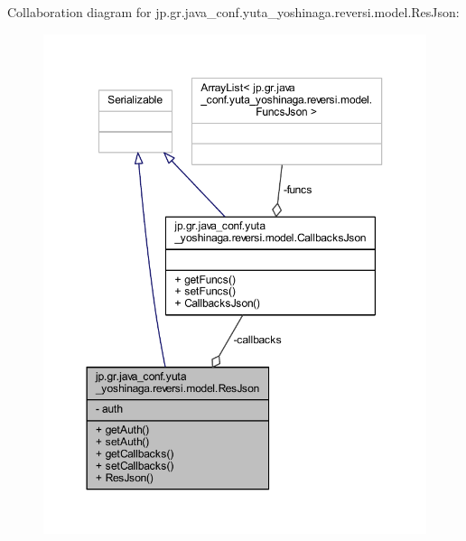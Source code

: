 Collaboration diagram for jp.\+gr.\+java\+\_\+conf.\+yuta\+\_\+yoshinaga.\+reversi.\+model.\+Res\+Json\+:\nopagebreak
\begin{figure}[H]
\begin{center}
\leavevmode
\includegraphics[width=350pt]{classjp_1_1gr_1_1java__conf_1_1yuta__yoshinaga_1_1reversi_1_1model_1_1_res_json__coll__graph}
\end{center}
\end{figure}
